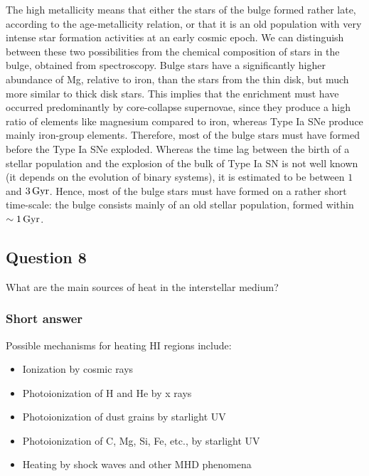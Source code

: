 \documentclass[a4paper,10pt]{article}
\begin{document}
{\noindent}The high metallicity means that either the stars of the bulge formed rather late, according to the age-metallicity relation, or that it is an old population with very intense star formation activities at an early cosmic epoch. We can distinguish between these two possibilities from the chemical composition of stars in the bulge, obtained from spectroscopy. Bulge stars have a significantly higher abundance of Mg, relative to iron, than the stars from the thin disk, but much more similar to thick disk stars. This implies that the enrichment must have occurred predominantly by core-collapse supernovae, since they produce a high ratio of elements like magnesium compared to iron, whereas Type Ia SNe produce mainly iron-group elements. Therefore, most of the bulge stars must have formed before the Type Ia SNe exploded. Whereas the time lag between the birth of a stellar population and the explosion of the bulk of Type Ia SN is not well known (it depends on the evolution of binary systems), it is estimated to be between $1$ and $3\,{\rm Gyr}$. Hence, most of the bulge stars must have formed on a rather short time-scale: the bulge consists mainly of an old stellar population, formed within $\sim1\,{\rm Gyr}$.


\newpage
\subsection{Question 8}

What are the main sources of heat in the interstellar medium?

\subsubsection{Short answer}

Possible mechanisms for heating HI regions include:

\begin{itemize}
    \item Ionization by cosmic rays
    \item Photoionization of H and He by x rays
    \item Photoionization of dust grains by starlight UV
    \item Photoionization of C, Mg, Si, Fe, etc., by starlight UV
    \item Heating by shock waves and other MHD phenomena
\end{itemize}
\end{document}
